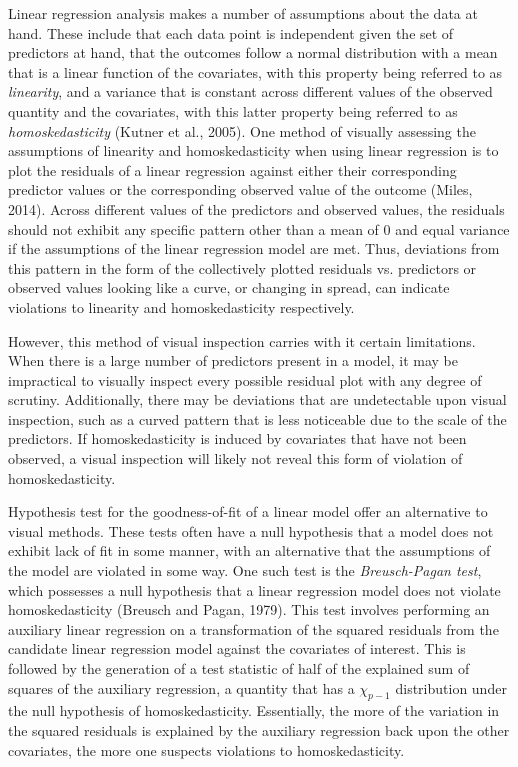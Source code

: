 		Linear regression analysis makes a number of assumptions about the data at hand. These include that each data point is independent given the set of predictors at hand, that the
		outcomes follow a normal distribution with a mean that is a linear function of the covariates, with this property being referred to as \textit{linearity}, and a variance that is constant
		across different values of the observed quantity and the covariates, with this latter property being referred to as \textit{homoskedasticity} (Kutner et al., 2005). One method of visually
		assessing the assumptions of linearity and homoskedasticity when using linear regression is to plot the residuals of a linear regression against either their corresponding predictor
		values or the corresponding observed value of the outcome (Miles, 2014). Across different values of the predictors and observed values, the residuals should not exhibit any specific pattern
		other than a mean of 0 and equal variance if the assumptions of the linear regression model are met. Thus, deviations from this pattern in the form of the collectively plotted residuals
		vs. predictors or observed values looking like a curve, or changing in spread, can indicate violations to linearity and homoskedasticity respectively.

		However, this method of visual inspection carries with it certain limitations. When there is a large number of predictors present in a model, it may be impractical to visually inspect every
		possible residual plot with any degree of scrutiny. Additionally, there may be deviations that are undetectable upon visual inspection, such as a curved pattern that is less noticeable
		due to the scale of the predictors. If homoskedasticity is induced by covariates that have not been observed, a visual inspection will likely not reveal this form of
		violation of homoskedasticity.

		Hypothesis test for the goodness-of-fit of a linear model offer an alternative to visual methods. These tests often have a null hypothesis that a model does not exhibit lack of fit in 
		some manner, with an alternative that the assumptions of the model are violated in some way. One such test is the \textit{Breusch-Pagan test}, which possesses a null hypothesis that a linear
		regression model does not violate homoskedasticity (Breusch and Pagan, 1979). This test involves performing an auxiliary linear regression on a transformation of the squared residuals from
		the candidate linear regression model against the covariates of interest. This is followed by the generation of a test statistic of half of the explained sum of squares of the auxiliary
		regression, a quantity that has a $\chi_{p-1}$ distribution under the null hypothesis of homoskedasticity. Essentially, the more of the variation in the squared residuals is explained by the
		auxiliary regression back upon the other covariates, the more one suspects violations to homoskedasticity.

